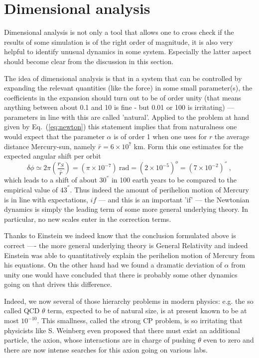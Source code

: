 \documentclass[12pt]{iopart}
\providecommand{\DIFdelend}{} %
\DeclareRobustCommand{\DIFdelend}{\DIFOaddend \let\includegraphics\DIFOincludegraphics} %
\begin{document}
\DIFdelend \section{Dimensional analysis}

Dimensional analysis is not only a tool that allows one to cross check if the results of some simulation is
of the right order of magnitude, it is also very helpful to identify unusual dynamics in some system.
Especially the latter aspect should become clear from the discussion in this section.

The idea of dimensional analysis is that in a system that can be controlled by expanding the relevant quantities
(like the force) in some small parameter(s), the coefficients in the expansion should turn out to be of order unity (that
means anything between about 0.1 and 10 is fine - but 0.01 or 100 is irritating) --- parameters in line with this
are called 'natural'. Applied to the problem at hand
given by Eq.~(\ref{eq:newton}) this statement implies that from naturalness one would expect that 
the parameter $\alpha$ is of order 1 when one uses
for $r$ the average distance Mercury-sun, namely $\bar r=6\times 10^7$ km.
Form this one estimates for the expected angular shift per orbit
\begin{equation}
\delta \phi \simeq 2\pi\left(\frac{r_S}{\bar r}\right) = (\pi \times 10^{-7}) \ \mbox{rad} = (2\times 10^{-5})^o = (7\times 10^{-2}) ^{''} \ ,
\end{equation}
which leads to a shift of  about $30^{''}$ in 100 earth years to be compared to the empirical value of $43^{''}$.
 Thus indeed the
amount of perihelion motion of Mercury is in line with expectations, $if$ --- and this is an important 'if' ---
the Newtonian dynamics is simply the leading term of some more general underlying theory. In particular,
no new scales enter in the correction terms.

Thanks to Einstein we indeed know that the conclusion formulated above is correct ---- the more general underlying
theory is General Relativity and indeed Einstein was able to quantitatively explain the perihelion motion of Mercury
from his equations. 
On the other hand had we found a dramatic deviation of $\alpha$ from unity one would have concluded that 
there is probably some other dynamics going on that drives this difference.

Indeed, we now several of those hierarchy problems in modern physics: e.g. the so called QCD $\theta$ term,
expected to be of natural size, is at present known to be at most $10^{-10}$. This smallness, called the
strong CP problem, is so irritating that physicists like S. Weinberg even proposed that there must exist an
additional particle, the axion, whose interactions are in charge of pushing $\theta$ even to zero and there
are now intense searches for this axion going on various labs.
\end{document}
